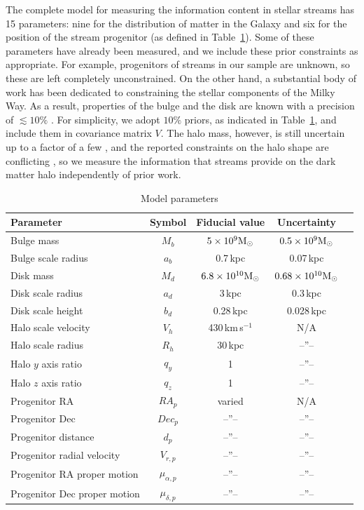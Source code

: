 \documentclass[modern]{aastex62}
\begin{document}
The complete model for measuring the information content in stellar streams has 15 parameters: nine for the distribution of matter in the Galaxy and six for the position of the stream progenitor (as defined in Table~\ref{t:model}).
Some of these parameters have already been measured, and we include these prior constraints as appropriate. 
For example, progenitors of streams in our sample are unknown, so these are left completely unconstrained.
On the other hand, a substantial body of work has been dedicated to constraining the stellar components of the Milky Way.
As a result, properties of the bulge and the disk are known with a precision of $\lesssim10\%$ \citep{bobylev2017}.
For simplicity, we adopt $10\%$ priors, as indicated in Table~\ref{t:model}, and include them in covariance matrix $V$.
The halo mass, however, is still uncertain up to a factor of a few \citep[e.g.,][]{eadie2016, zaritsky2017}, and the reported constraints on the halo shape are conflicting \citep[e.g.,][]{loebman2014, bowden2016}, so we measure the information that streams provide on the dark matter halo independently of prior work.

\begin{table}
\begin{center}
\begin{tabular}{l c c c l}
\hline
\hline
Parameter & Symbol & Fiducial value & Uncertainty \\
\hline
\hline
Bulge mass & $M_b$ & $5\times10^{9}\rm M_\odot$ & $0.5\times10^{9}\rm M_\odot$ \\
Bulge scale radius & $a_b$ & 0.7\,kpc & 0.07\,kpc \\
Disk mass & $M_d$ & $6.8\times10^{10}\rm M_\odot$ & $0.68\times10^{10}\rm M_\odot$ \\
Disk scale radius & $a_d$ & 3\,kpc & 0.3\,kpc\\
Disk scale height & $b_d$ & 0.28\,kpc& 0.028\,kpc \\
\hline
Halo scale velocity & $V_h$ & 430\,km\,s$^{-1}$ & N/A \\
Halo scale radius & $R_h$ & 30\,kpc & --''-- \\
Halo $y$ axis ratio & $q_y$ & 1 & --''-- \\
Halo $z$ axis ratio & $q_z$ & 1 & --''-- \\
\hline
Progenitor RA & $RA_p$ & varied & N/A \\
Progenitor Dec & $Dec_p$ & --''-- & --''-- \\
Progenitor distance & $d_p$ & --''-- & --''-- \\
Progenitor radial velocity & $V_{r,p}$ & --''-- & --''-- \\
Progenitor RA proper motion & $\mu_{\alpha,p}$ & --''-- & --''-- \\
Progenitor Dec proper motion & $\mu_{\delta,p}$ & --''-- & --''-- \\
\hline
\hline
\end{tabular}
\caption{Model parameters}
\label{t:model}
\end{center}
\end{table}
\end{document}
